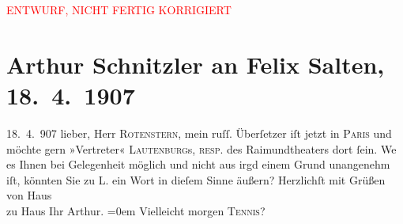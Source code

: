 
\begin{center}
            \textcolor{red}{ENTWURF, NICHT FERTIG KORRIGIERT}
                      \end{center}
            
         
         \renewcommand{\erwaehntePersonen}{Personen: Sigmund Lautenburg, Felix Salten}
         \renewcommand{\erwaehnteInstitutionen}{Institutionen: Raimund-Theater}
         \renewcommand{\erwaehnteOrte}{Orte: Paris, Wien}
         \renewcommand{\erwaehnteWerke}{}
               \section[Arthur Schnitzler an Felix Salten, 18. 4. 1907]{ Arthur Schnitzler an Felix Salten, 18. 4. 1907}\nopagebreak{}\rehead{ }\begin{ledgroupsized}[t]{13cm}\normalsize\beginnumbering \toendnotes[C]{\smallbreak\pagebreak[2]} 
\pstart
           \raggedleft{}{\pb}18. 4. 907\pend
           \pstart{}lieber,\pend\pstart
           Herr \textsc{Rotenstern}, mein ruſſ. Überſetzer iſt jetzt in \textsc{Paris} und möchte gern »Vertreter« \textsc{Lautenburg}s, \textsc{resp.} des Raimundtheaters dort ſein. We{\geminationn} es Ihnen bei
               Gelegenheit möglich  und nicht aus irgd einem
               Grund unangenehm iſt, könnten Sie zu L. ein Wort in
               dieſem Sinne äußern? \pend
           \pstart
           Herzlichſt mit Grüßen von Haus {\\[\baselineskip]}zu Haus Ihr \spacefill\mbox{Arthur.}\pend
           \leftskip=0em{}\pstart
           \noindent{}Vielleicht morgen \textsc{Tennis}? \pend
           
         
         \endnumbering{}\end{ledgroupsized}\begin{anhang}\end{anhang}\newcommand{\dateiname}{L03008}\newcommand{\titel}{Arthur Schnitzler an Felix Salten, 18. 4. 1907}\newcommand{\editorInnen}{Martin Anton Müller und Laura Untner}
      